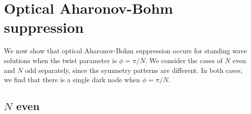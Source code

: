 \documentclass[reprint, amsmath,amssymb,aps,pra]{revtex4-2}
\begin{document}
\section{Optical Aharonov-Bohm suppression}\label{sec:ABsupp}

We now show that optical Aharonov-Bohm suppression occurs for standing wave solutions when the twist parameter is $\phi = \pi/N$. We consider the cases of $N$ even and $N$ odd separately, since the symmetry patterns are different. In both cases, we find that there is a single dark node when $\phi = \pi/N$.

\subsection{\texorpdfstring{$N$}{N} even}\label{sec:Neven}
\end{document}

